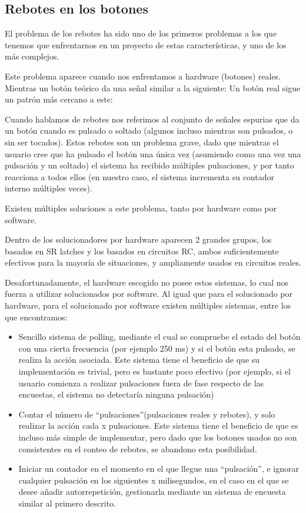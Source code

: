 \documentclass[12pt,letterpaper]{article}
\begin{document}
\subsection{Rebotes en los botones}
\label{subsec:rebotes}
El problema de los rebotes ha sido uno de los primeros problemas a los
que tenemos que enfrentarnos en un proyecto de estas características,
y uno de los más complejos.

Este problema aparece cuando nos enfrentamos a hardware (botones)
reales. Mientras un botón teórico da una señal similar a la siguiente:
Un botón real sigue un patrón más cercano a este:

Cuando hablamos de rebotes nos referimos al conjunto de señales
espurias que da un botón cuando es pulsado o soltado (algunos incluso
mientras son pulsados, o sin ser tocados). Estos rebotes son un
problema grave, dado que mientras el usuario cree que ha pulsado el
botón una única vez (asumiendo como una vez una pulsación y un
soltado) el sistema ha recibido múltiples pulsaciones, y por tanto
reacciona a todos ellos (en nuestro caso, el sistema incrementa su
contador interno múltiples veces).

Existen múltiples soluciones a este problema, tanto por hardware como
por software.

Dentro de los solucionadores por hardware aparecen 2 grandes grupos,
los basados en SR latches y los basados en circuitos RC, ambos
suficientemente efectivos para la mayoría de situaciones, y
ampliamente usados en circuitos reales.

Desafortunadamente, el hardware escogido no posee estos sistemas, lo
cual nos fuerza a utilizar solucionados por software. Al igual que
para el solucionado por hardware, para el solucionado por software
existen múltiples sistemas, entre los que encontramos:
\begin{itemize}
  \item Sencillo sistema de polling, mediante el cual se compruebe el
    estado del botón con una cierta frecuencia (por ejemplo 250 ms) y
    si el botón esta pulsado, se realiza la acción asociada. Este
    sistema tiene el beneficio de que su implementación es trivial,
    pero es bastante poco efectivo (por ejemplo, si el usuario
    comienza a realizar pulsaciones fuera de fase respecto de las
    encuestas, el sistema no detectaría ninguna pulsación)
  \item Contar el número de ``pulsaciones''(pulsaciones reales y
    rebotes), y solo realizar la acción cada x pulsaciones. Este
    sistema tiene el beneficio de que es incluso más simple de
    implementar, pero dado que los botones usados no son consistentes
    en el conteo de rebotes, se abandono esta posibilidad.
  \item Iniciar un contador en el momento en el que llegue una
    ``pulsación'', e ignorar cualquier pulsación en los siguientes x
    milisegundos, en el caso en el que se desee añadir autorrepetición,
    gestionarla mediante un sistema de encuesta similar al primero
    descrito.
\end{itemize}
\end{document}
